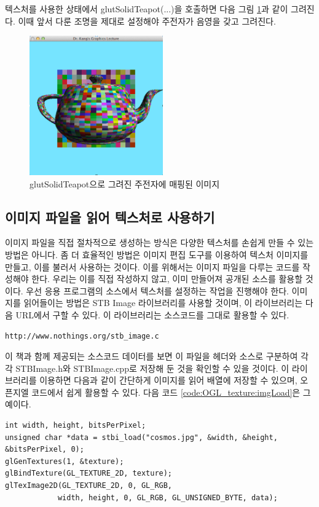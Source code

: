 텍스처를 사용한 상태에서 {\sf glutSolidTeapot(...)}을 호출하면 다음 그림 \ref{fig:OGL_texture:texMap3}과 같이 그려진다. 이때 앞서 다룬 조명을 제대로 설정해야 주전자가 음영을 갖고 그려진다.

\begin{figure}[h!]
  \centering
	\includegraphics[height=6cm]{OGL_texture/texMap3.png}
    \caption{glutSolidTeapot으로 그려진 주전자에 매핑된 이미지}
    \label{fig:OGL_texture:texMap3}
\end{figure}


\subsection{이미지 파일을 읽어 텍스처로 사용하기}

이미지 파일을 직접 절차적으로 생성하는 방식은 다양한 텍스처를 손쉽게 만들 수 있는 방법은 아니다. 좀 더 효율적인 방법은 이미지 편집 도구를 이용하여 텍스처 이미지를 만들고, 이를 불러서 사용하는 것이다. 이를 위해서는 이미지 파일을 다루는 코드를 작성해야 한다. 우리는 이를 직접 작성하지 않고, 이미 만들어져 공개된 소스를 활용할 것이다.
우선 응용 프로그램의 소스에서 텍스처를 설정하는 작업을 진행해야 한다. 이미지를 읽어들이는 방법은 STB Image 라이브러리를 사용할 것이며, 이 라이브러리는 다음 URL에서 구할 수 있다. 이 라이브러리는 소스코드를 그대로 활용할 수 있다.
\begin{verbatim}
http://www.nothings.org/stb_image.c
\end{verbatim}
이 책과 함께 제공되는 소스코드 데이터를 보면 이 파일을 헤더와 소스로 구분하여 각각 {\sf STBImage.h}와 {\sf STBImage.cpp}로 저장해 둔 것을 확인할 수 있을 것이다. 이 라이브러리를 이용하면 다음과 같이 간단하게 이미지를 읽어 배열에 저장할 수 있으며, 오픈지엘 코드에서 쉽게 활용할 수 있다. 다음 코드 \ref{code:OGL_texture:imgLoad}은 그 예이다.


\begin{algorithmbis}\label{code:OGL_texture:imgLoad}
\lstset{language=C++} 
\begin{lstlisting}
int width, height, bitsPerPixel;
unsigned char *data = stbi_load("cosmos.jpg", &width, &height, &bitsPerPixel, 0);
glGenTextures(1, &texture);
glBindTexture(GL_TEXTURE_2D, texture);
glTexImage2D(GL_TEXTURE_2D, 0, GL_RGB, 
			width, height, 0, GL_RGB, GL_UNSIGNED_BYTE, data);
\end{lstlisting}
\end{algorithmbis}

